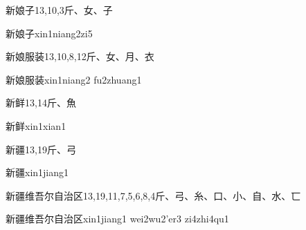 \begin{Entry}{新娘子}{13,10,3}{⽄、⼥、⼦}
  \begin{Phonetics}{新娘子}{xin1niang2zi5}
  \end{Phonetics}
\end{Entry}

\begin{Entry}{新娘服装}{13,10,8,12}{⽄、⼥、⽉、⾐}
  \begin{Phonetics}{新娘服装}{xin1niang2 fu2zhuang1}
  \end{Phonetics}
\end{Entry}

\begin{Entry}{新鲜}{13,14}{⽄、⿂}
  \begin{Phonetics}{新鲜}{xin1xian1}
  \end{Phonetics}
\end{Entry}

\begin{Entry}{新疆}{13,19}{⽄、⼸}
  \begin{Phonetics}{新疆}{xin1jiang1}
  \end{Phonetics}
\end{Entry}

\begin{Entry}{新疆维吾尔自治区}{13,19,11,7,5,6,8,4}{⽄、⼸、⽷、⼝、⼩、⾃、⽔、⼖}
  \begin{Phonetics}{新疆维吾尔自治区}{xin1jiang1 wei2wu2'er3 zi4zhi4qu1}
  \end{Phonetics}
\end{Entry}


